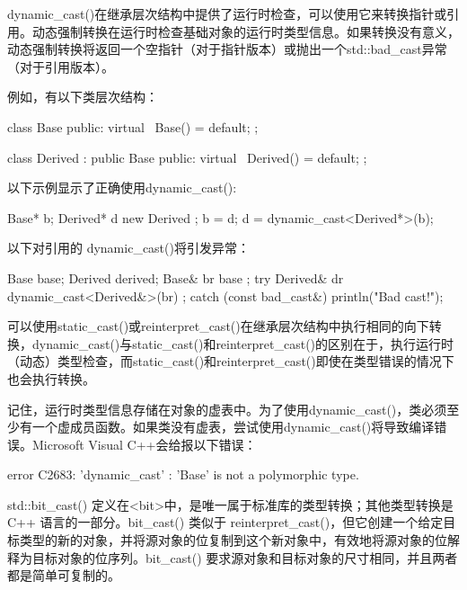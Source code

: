 
dynamic\_cast()在继承层次结构中提供了运行时检查，可以使用它来转换指针或引用。动态强制转换在运行时检查基础对象的运行时类型信息。如果转换没有意义，动态强制转换将返回一个空指针（对于指针版本）或抛出一个std::bad\_cast异常（对于引用版本）。

例如，有以下类层次结构：

\begin{cpp}
class Base
{
    public:
        virtual ~Base() = default;
};

class Derived : public Base
{
    public:
        virtual ~Derived() = default;
};
\end{cpp}

以下示例显示了正确使用dynamic\_cast():

\begin{cpp}
Base* b;
Derived* d { new Derived {} };
b = d;
d = dynamic_cast<Derived*>(b);
\end{cpp}

以下对引用的 dynamic\_cast()将引发异常：

\begin{cpp}
Base base;
Derived derived;
Base& br { base };
try {
    Derived& dr { dynamic_cast<Derived&>(br) };
} catch (const bad_cast&) {
    println("Bad cast!");
}
\end{cpp}

可以使用static\_cast()或reinterpret\_cast()在继承层次结构中执行相同的向下转换，dynamic\_cast()与static\_cast()和reinterpret\_cast()的区别在于，执行运行时（动态）类型检查，而static\_cast()和reinterpret\_cast()即使在类型错误的情况下也会执行转换。

记住，运行时类型信息存储在对象的虚表中。为了使用dynamic\_cast()，类必须至少有一个虚成员函数。如果类没有虚表，尝试使用dynamic\_cast()将导致编译错误。Microsoft Visual C++会给报以下错误：

\begin{shell}
error C2683: 'dynamic_cast' : 'Base' is not a polymorphic type.
\end{shell}


std::bit\_cast() 定义在<bit>中，是唯一属于标准库的类型转换；其他类型转换是 C++ 语言的一部分。bit\_cast() 类似于 reinterpret\_cast()，但它创建一个给定目标类型的新的对象，并将源对象的位复制到这个新对象中，有效地将源对象的位解释为目标对象的位序列。bit\_cast() 要求源对象和目标对象的尺寸相同，并且两者都是简单可复制的。

